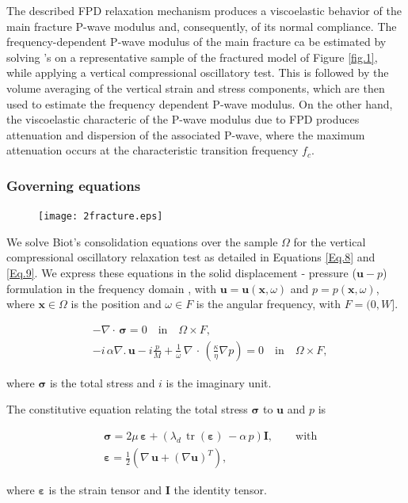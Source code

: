 \documentclass[draft]{agujournal2019}
\DeclareMathOperator{\tr}{tr}
\begin{document}
The described FPD relaxation mechanism produces a viscoelastic behavior of the main fracture P-wave modulus and, consequently, of its normal compliance. 
The frequency-dependent P-wave modulus of the  main fracture ca be estimated by solving \citeauthor{Biot1941}'s \citeyear{Biot1941} on a representative sample of the fractured model of Figure \ref{fig.1}, while applying a vertical compressional oscillatory test. This is 
followed by the volume averaging of the vertical strain and stress components, which are then used to estimate the frequency dependent P-wave modulus. On the other hand, the viscoelastic characteric of the P-wave modulus due to FPD produces attenuation and dispersion of the associated P-wave, where the maximum attenuation occurs at the characteristic transition frequency $f_c$.


\subsubsection{Governing equations}

 \begin{figure}[!ht]
\centering
        \texttt{[image: 2fracture.eps]}
\caption{
}
\label{fig.2}
\end{figure}
We solve Biot's consolidation equations \cite{Biot1941} over the sample $\Omega$  for the vertical compressional oscillatory relaxation test as detailed in Equations
\eqref{Eq.8} and \eqref{Eq.9}. 
We express these equations in the solid displacement - pressure ($\bm{u}-p$) formulation in the frequency domain \cite{Quintal2011,Favino2020},  with $\bm{u} = \bm{u}(\bm{x}, \omega)$ and $p = p(\bm{x},\omega)$, where $\bm{x} \in \Omega$ is the position  and $\omega \in F$ is the angular frequency, with $F =(0,W]$. 
\begin{linenomath*}
\begin{equation}\label{Eq.6}
\begin{split}
& - \nabla \cdot \, \bm{\sigma} =0  \quad  \textrm{in} \quad \Omega \times F,  \\
& - i \, \alpha \nabla . \, \bm{u} -i \frac{p}{M} + \frac{1}{\omega} \,\nabla \, \cdot \, \left( \frac{\kappa}{\eta} \nabla p\right)  =0 \quad  \textrm{in} \quad \Omega \times F,
\end{split}
\end{equation}
\end{linenomath*}
where $\bm{\sigma}$ is the total stress and $i$ is the imaginary unit.

The constitutive equation relating the total stress $\bm{\sigma}$ to $\bm{u}$ and $p$ is
\begin{linenomath*}
\begin{equation}\label{Eq.7}
\begin{split}
& \bm{\sigma} =  2\mu \, \bm{\varepsilon} +  \left( \lambda_d \,  \tr( \bm{\varepsilon})\, - \alpha \,p \right) \bm{I}, \qquad \text{with}\\
& \bm{\varepsilon} = \frac{1}{2} \left( \nabla \,\bm{u} + ({\nabla  \bm{u}})^T  \right),
\end{split}
\end{equation}
\end{linenomath*}
where $\bm{\varepsilon}$ is the strain tensor and $\bm{I}$ the identity tensor. 
\end{document}
